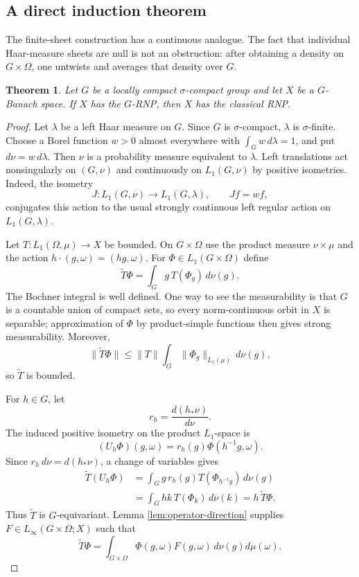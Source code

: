 \documentclass[11pt]{article}
\newtheorem{theorem}{Theorem}[section]
\theoremstyle{remark}
\begin{document}
\subsection{A direct induction theorem}

The finite-sheet construction has a continuous analogue.  The fact that
individual Haar-measure sheets are null is not an obstruction: after obtaining
a density on $G\times\Omega$, one untwists and averages that density over
$G$.

\begin{theorem}\label{thm:lcsc}
Let $G$ be a locally compact $\sigma$-compact group and let $X$ be a
$G$-Banach space.  If $X$ has the $G$-RNP, then $X$ has the classical RNP.
\end{theorem}

\begin{proof}
Let $\lambda$ be a left Haar measure on $G$.  Since $G$ is
$\sigma$-compact, $\lambda$ is $\sigma$-finite.  Choose a Borel function
$w>0$ almost everywhere with $\int_Gw\,d\lambda=1$, and put
$d\nu=w\,d\lambda$.  Then $\nu$ is a probability measure equivalent to
$\lambda$.  Left translations act nonsingularly on $(G,\nu)$ and
continuously on $L_1(G,\nu)$ by positive isometries.  Indeed, the isometry
\[
 J:L_1(G,\nu)\longrightarrow L_1(G,\lambda),\qquad Jf=wf,
\]
conjugates this action to the usual strongly continuous left regular
action on $L_1(G,\lambda)$.

Let $T:L_1(\Omega,\mu)\to X$ be bounded.  On $G\times\Omega$ use the
product measure $\nu\times\mu$ and the action
$h\cdot(g,\omega)=(hg,\omega)$.  For
$\Phi\in L_1(G\times\Omega)$ define
\begin{equation*}
  \widetilde T\Phi
  =\int_G g\,T(\Phi_g)\,d\nu(g).
  \tag{3.1}
\end{equation*}
The Bochner integral is well defined.  One way to see the measurability is
that $G$ is a countable union of compact sets, so every norm-continuous orbit
in $X$ is separable; approximation of $\Phi$ by product-simple functions
then gives strong measurability.  Moreover,
\[
 \|\widetilde T\Phi\|
 \leq \|T\|\int_G\|\Phi_g\|_{L_1(\mu)}\,d\nu(g),
\]
so $\widetilde T$ is bounded.

For $h\in G$, let
\[
 r_h=\frac{d(h_*\nu)}{d\nu}.
\]
The induced positive isometry on the product $L_1$-space is
\[
 (U_h\Phi)(g,\omega)=r_h(g)\Phi(h^{-1}g,\omega).
\]
Since $r_h\,d\nu=d(h_*\nu)$, a change of variables gives
\begin{align*}
 \widetilde T(U_h\Phi)
 &=\int_G g\,r_h(g)T(\Phi_{h^{-1}g})\,d\nu(g)\\
 &=\int_G hk\,T(\Phi_k)\,d\nu(k)
 =h\,\widetilde T\Phi.
\end{align*}
Thus $\widetilde T$ is $G$-equivariant.  Lemma
\ref{lem:operator-direction} supplies
$F\in L_\infty(G\times\Omega;X)$ such that
\[
 \widetilde T\Phi
 =\int_{G\times\Omega}\Phi(g,\omega)F(g,\omega)
 \,d\nu(g)d\mu(\omega).
\]


\end{proof}
\end{document}
